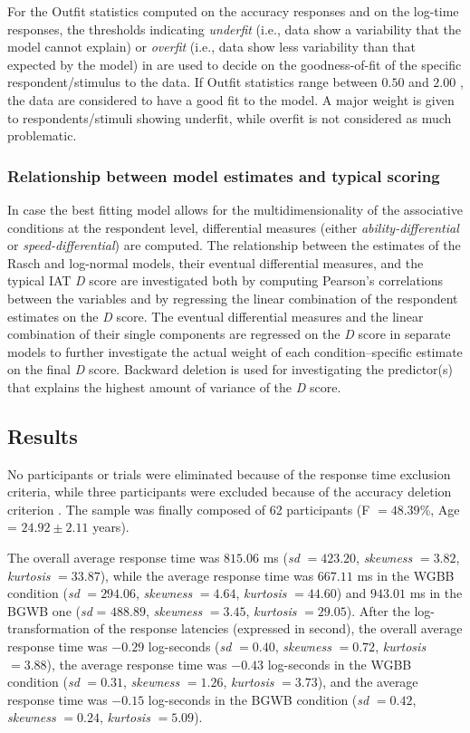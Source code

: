 \documentclass[12pt]{book}
\begin{document}
For the Outfit statistics computed on the accuracy responses and on the log-time responses, the thresholds indicating \emph{underfit} (i.e., data show a variability that the model cannot explain) or \emph{overfit} (i.e., data show less variability than that expected by the model) in  are used to decide on the goodness-of-fit of the specific respondent/stimulus to the data. 
	If Outfit statistics range between $0.50$ and $2.00$ \cite{linacre2002}, the data are considered to have a good fit to the model. 
	A major weight is given to respondents/stimuli showing underfit, while overfit is not considered as much problematic.

\subsubsection{Relationship between model estimates and typical scoring}

In case the best fitting model allows for the multidimensionality of the associative conditions at the respondent level, differential measures (either \emph{ability-differential} or \emph{speed-differential}) are computed. 
The relationship between the estimates of the Rasch and  log-normal models, their eventual differential measures, and the typical IAT \emph{D} score are investigated both by computing Pearson's correlations between the variables and by regressing the linear combination of the respondent estimates on the \emph{D} score. 
The eventual differential measures and the linear combination of their single components are regressed on the \emph{D} score in separate models to further investigate the actual weight of each condition--specific estimate on the final \emph{D} score. 
Backward deletion is used for investigating the predictor(s) that explains the highest amount of variance of the \emph{D} score. 


\subsection{Results}
No participants or trials were eliminated because of the response time exclusion criteria, while three participants were excluded because of the accuracy deletion criterion \cite{Nosek2002}. 
The sample was finally composed of 62 participants (F $=48.39$\%, Age = $24.92\pm2.11$ years).

The overall average response time was $815.06$ ms (\emph{sd} $= 423.20$, \emph{skewness} $= 3.82$, \emph{kurtosis} $= 33.87$), while the average response time  was $667.11$ ms in the
WGBB condition (\emph{sd} $= 294.06$, \emph{skewness} $= 4.64$, \emph{kurtosis} $= 44.60$) and $943.01$ ms  in the BGWB one (\emph{sd} = $488.89$, \emph{skewness} $= 3.45$, \emph{kurtosis} $= 29.05$). 
After the log-transformation of the response latencies (expressed in second), the overall average response time was $-0.29$ log-seconds (\emph{sd} $= 0.40$, \emph{skewness} $= 0.72$, \emph{kurtosis} $= 3.88$), the average response time was $-0.43$ log-seconds in the WGBB condition (\emph{sd} $= 0.31$, \emph{skewness} $= 1.26$, \emph{kurtosis} $= 3.73$), and the average response time was $-0.15$ log-seconds in the BGWB condition (\emph{sd} $= 0.42$, \emph{skewness} $= 0.24$, \emph{kurtosis} $= 5.09$).
\end{document}
